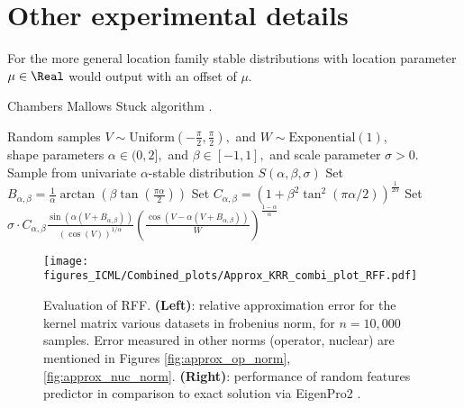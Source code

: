 \documentclass{article}
\def\cite{\citep}
\theoremstyle{plain}
\begin{document}
\section{Other experimental details}
\label{appendix:expts}
For the more general location family stable distributions with location parameter $\mu\in\Real$ would output with an offset of $\mu.$
\begin{algorithm}[H]
\caption{\label{algo:cms}Chambers Mallows Stuck algorithm \cite{chambers1976method}.}
\begin{algorithmic}
\REQUIRE Random samples $V \sim \text{Uniform}(-\frac\pi2, \frac\pi2), $ and $W \sim \text{Exponential}(1)$,\\ shape parameters $\alpha \in (0,2],$ and $ \beta \in [-1, 1],$ and scale parameter $\sigma>0.$
 Sample from univariate $\alpha$-stable distribution $S(\alpha, \beta, \sigma)$
\STATE Set $B_{\alpha, \beta} = \frac{1}{\alpha}\arctan(\beta \tan(\frac{\pi \alpha}{2}))$
\STATE Set $C_{\alpha, \beta} = (1+\beta^2\tan^2(\pi\alpha/2))^\frac{1}{2\alpha} $
\RETURN Set $\sigma\cdot C_{\alpha, \beta} \frac{\sin(\alpha(V + B_{\alpha, \beta}))}{(\cos(V))^{1/\alpha}}\left(\frac{\cos(V - \alpha(V + B_{\alpha, \beta}))}{W}\right)^{\frac{1-\alpha}{\alpha}}$
\end{algorithmic}
\end{algorithm}

\begin{figure}
\texttt{[image: figures\_ICML/Combined\_plots/Approx\_KRR\_combi\_plot\_RFF.pdf]}
\caption{\label{fig:RFF_eval}Evaluation of RFF. \textbf{(Left)}: relative approximation error for the kernel matrix various datasets in frobenius norm, for $n=10,000$ samples. Error measured in other norms (operator, nuclear) are mentioned in Figures \ref{fig:approx_op_norm}, \ref{fig:approx_nuc_norm}. \textbf{(Right)}: performance of random features predictor in comparison to exact solution via EigenPro2 \cite{ma2019kernel}.}
\end{figure}
\end{document}
